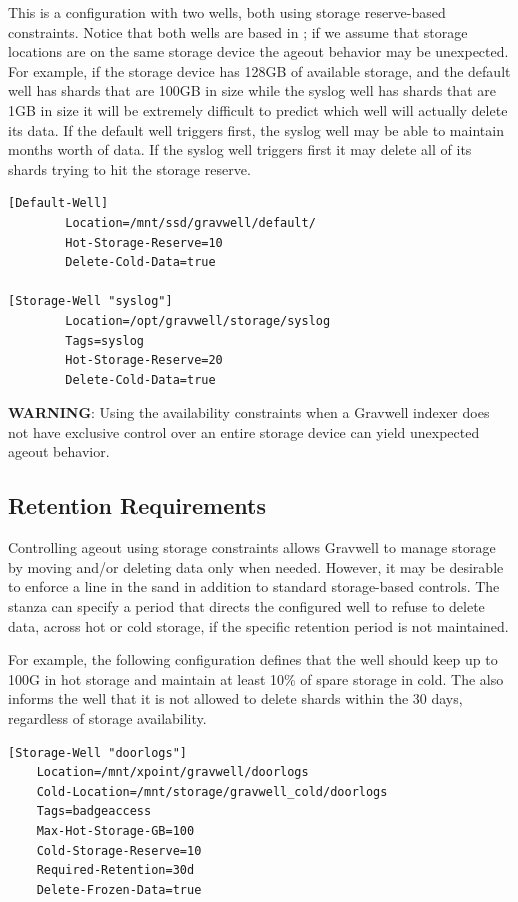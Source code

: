 {{This is a configuration with two wells, both using storage
reserve-based constraints. Notice that both wells are based in
; if we assume that storage locations are on
the same storage device the ageout behavior may be unexpected. For
example, if the storage device has 128GB of available storage, and the
default well has shards that are 100GB in size while the syslog well has
shards that are 1GB in size it will be extremely difficult to predict
which well will actually delete its data. If the default well
triggers first, the syslog well may be able to maintain months worth
of data. If the syslog well triggers first it may delete all of its
shards trying to hit the storage reserve.

\begin{Verbatim}[breaklines=true]
[Default-Well]
        Location=/mnt/ssd/gravwell/default/
        Hot-Storage-Reserve=10
        Delete-Cold-Data=true

[Storage-Well "syslog"]
        Location=/opt/gravwell/storage/syslog
        Tags=syslog
        Hot-Storage-Reserve=20
        Delete-Cold-Data=true
\end{Verbatim}

\textbf{WARNING}: Using the availability constraints when a Gravwell indexer
does not have exclusive control over an entire storage device can yield
unexpected ageout behavior.

\subsection{Retention Requirements}

Controlling ageout using storage constraints allows Gravwell to manage storage
by moving and/or deleting data only when needed. However, it may be desirable
to enforce a line in the sand in addition to standard storage-based controls.
The  stanza can specify a period that directs the configured
well to refuse to delete data, across hot or cold storage,
if the specific retention period is not maintained.

For example, the following configuration defines that the well should keep up
to 100G in hot storage and maintain at least 10\% of spare storage in cold.
The  also informs the well that it is not allowed
to delete shards within the 30 days, regardless of storage availability.

\begin{Verbatim}[breaklines=true]
[Storage-Well "doorlogs"]
	Location=/mnt/xpoint/gravwell/doorlogs
	Cold-Location=/mnt/storage/gravwell_cold/doorlogs
	Tags=badgeaccess
	Max-Hot-Storage-GB=100
	Cold-Storage-Reserve=10
	Required-Retention=30d
	Delete-Frozen-Data=true	
\end{Verbatim}

}}
